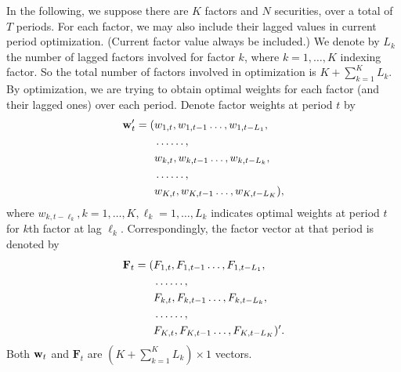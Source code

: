 In the following, we suppose there are $K$ factors and $N$ securities,
over a total of $T$ periods. 
For each factor, we may also include their lagged values in current period optimization.
(Current factor value always be included.)
We denote by $L_k$ the number of lagged factors involved for factor $k$,
where $k=1,\ldots,K$ indexing factor. 
So the total number of factors involved in optimization is $K+\sum_{k=1}^K L_k$.
By optimization, we are trying to obtain optimal weights for each factor (and their lagged ones)
over each period.
Denote factor weights at period $t$ by
   \begin{align}\label{eq:W}
     \mathbf{w}'_t=(&w_{1,t},w_{1,t-1}\ldots,\allowbreak w_{1,t-L_1},\notag\\
             & \ldots \ldots,\notag\\
             & w_{k,t},w_{k,t-1}\ldots,\allowbreak w_{k,t-L_k},\\
             & \ldots \ldots,\notag\\
             & w_{K,t},w_{K,t-1}\ldots,\allowbreak w_{K,t-L_K}),\notag
   \end{align}
where $w_{k,t-\ell_k},k=1,\ldots,K,\ell_k=1,\ldots,L_k$ indicates optimal weights at period $t$ for $k$th factor at lag $\ell_k$.
Correspondingly, the factor vector at that period is denoted by
   \begin{align}\label{eq:F}
     \mathbf{F}_t=(&F_{1,t},F_{1,t-1}\ldots,\allowbreak F_{1,t-L_1},\notag\\
             & \ldots \ldots,\notag\\
             & F_{k,t},F_{k,t-1}\ldots,\allowbreak F_{k,t-L_k},\\
             & \ldots \ldots,\notag\\
             & F_{K,t},F_{K,t-1}\ldots,\allowbreak F_{K,t-L_K})'.\notag
   \end{align}
Both $\mathbf{w}_t$ and $\mathbf{F}_t$ are $(K+\sum_{k=1}^K L_k)\times 1$ vectors.


\iffalse
The composited moving-average factor, denoted by $\mathbf{F}_t^{\text{c,ma}}$, is
   \begin{equation}\label{eq:Fcma}
       F_t^{\text{c,ma}} = \Lbw_t' \mathbf{F}_t.
	\end{equation}
For one security, it is a scalar. 
Collect all such values for all securities,
It is a $N\times 1$ vector of 
  \begin{equation}
   \mathbf{F}_{t}^{\text{c,ma}} = ({F}_{t,i}^{\text{c,ma}})_{i=1,\ldots,N}.
  \end{equation}
\fi

